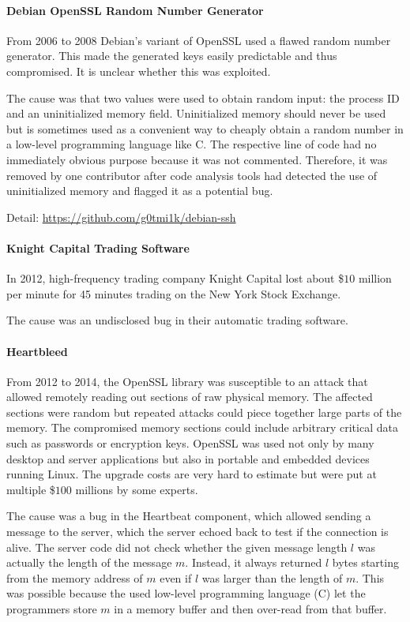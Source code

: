 \paragraph{Debian OpenSSL Random Number Generator}
From 2006 to 2008 Debian's variant of OpenSSL used a flawed random number generator.
This made the generated keys easily predictable and thus compromised.
It is unclear whether this was exploited.

The cause was that two values were used to obtain random input: the process ID and an uninitialized memory field.
Uninitialized memory should never be used but is sometimes used as a convenient way to cheaply obtain a random number in a low-level programming language like C.
The respective line of code had no immediately obvious purpose because it was not commented.
Therefore, it was removed by one contributor after code analysis tools had detected the use of uninitialized memory and flagged it as a potential bug.

Detail: \url{https://github.com/g0tmi1k/debian-ssh}

\paragraph{Knight Capital Trading Software}
In 2012, high-frequency trading company Knight Capital lost about \$$10$ million per minute for 45 minutes trading on the New York Stock Exchange.

The cause was an undisclosed bug in their automatic trading software.

\paragraph{Heartbleed}
From 2012 to 2014, the OpenSSL library was susceptible to an attack that allowed remotely reading out sections of raw physical memory.
The affected sections were random but repeated attacks could piece together large parts of the memory.
The compromised memory sections could include arbitrary critical data such as passwords or encryption keys.
OpenSSL was used not only by many desktop and server applications but also in portable and embedded devices running Linux.
The upgrade costs are very hard to estimate but were put at multiple \$$100$ millions by some experts.

The cause was a bug in the Heartbeat component, which allowed sending a message to the server, which the server echoed back to test if the connection is alive.
The server code did not check whether the given message length $l$ was actually the length of the message $m$.
Instead, it always returned $l$ bytes starting from the memory address of $m$ even if $l$ was larger than the length of $m$.
This was possible because the used low-level programming language (C) let the programmers store $m$ in a memory buffer and then over-read from that buffer.

